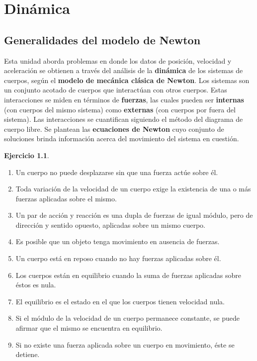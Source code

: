 \documentclass[a4paper,12pt,twoside]{book}
\newtheorem{ejercicio}{{Ejercicio}}[chapter]
\begin{document}
\chapter{Dinámica}


\section{Generalidades del modelo de Newton}

\begin{mdframed}[style=explicacion]
    Esta unidad aborda problemas en donde los datos de posición, velocidad y aceleración se obtienen a través del análisis de la \textbf{dinámica} de los sistemas de cuerpos, según el \textbf{modelo de mecánica clásica de Newton}. Los sistemas son un conjunto acotado de cuerpos que interactúan con otros cuerpos. Estas interacciones se miden en términos de \textbf{fuerzas}, las cuales pueden ser \textbf{internas} (con cuerpos del mismo sistema) como \textbf{externas} (con cuerpos por fuera del sistema). Las interacciones se cuantifican siguiendo el método del diagrama de cuerpo libre. Se plantean las \textbf{ecuaciones de Newton} cuyo conjunto de soluciones brinda información acerca del movimiento del sistema en cuestión. 
\end{mdframed}

\begin{mdframed}[style=ejercicio-conceptual]
    \begin{ejercicio}
    \end{ejercicio}
    \begin{enumerate}
        \item Un cuerpo no puede desplazarse sin que una fuerza actúe sobre él.
        \item Toda variación de la velocidad de un cuerpo exige la existencia de una o más fuerzas aplicadas sobre el mismo.
        \item Un par de acción y reacción es una dupla de fuerzas de igual módulo, pero de dirección y sentido opuesto, aplicadas sobre un mismo cuerpo.
        \item Es posible que un objeto tenga movimiento en ausencia de fuerzas.
        \item Un cuerpo está en reposo cuando no hay fuerzas aplicadas sobre él. 
        \item Los cuerpos están en equilibrio cuando la suma de fuerzas aplicadas sobre éstos es nula. 
        \item El equilibrio es el estado en el que los cuerpos tienen velocidad nula.
        \item Si el módulo de la velocidad de un cuerpo permanece constante, se puede afirmar que el mismo se encuentra en equilibrio.
        \item Si no existe una fuerza aplicada sobre un cuerpo en movimiento, éste se detiene.
    \end{enumerate}
\end{mdframed}
\end{document}
